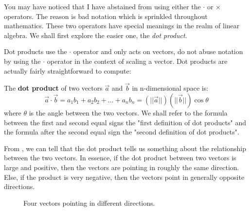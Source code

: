 You may have noticed that I have abstained from using either the \(\cdot \) or \(\times \) operators. The reason is bad notation which is sprinkled throughout mathematics. These two operators have special meanings in the realm of linear algebra. We shall first explore the easier one, the \emph{dot product}.


Dot products use the \(\cdot\) operator and only acts on vectors, do not abuse notation by using the \(\cdot\) operator in the context of scaling a vector. Dot products are actually fairly straightforward to compute:

\begin{definition}
  The \textbf{dot product} of two vectors \(\vec{a}\) and \(\vec{b}\) in n-dimensional space is:
  \begin{equation}
    \vec{a} \cdot \vec{b} = a_1 b_1 + a_2 b_2 + \dots + a_n b_n = (||\vec{a}||)(||\vec{b}||)\cos{\theta} 
    \label{dotproduct}
  \end{equation}
  where \(\theta\) is the angle between the two vectors. We shall refer to the formula between the first and second equal signs the "first definition of dot products" and the formula after the second equal sign the "second definition of dot products".
\end{definition}

From , we can tell that the dot product tells us something about the relationship between the two vectors. In essence, if the dot product between two vectors is large and positive, then the vectors are pointing in roughly the same direction. Else, if the product is very negative, then the vectors point in generally opposite directions.

\begin{figure}[h]
  \centering
  \caption{Four vectors pointing in different directions.}
  \label{dotproductfig}
\end{figure}

